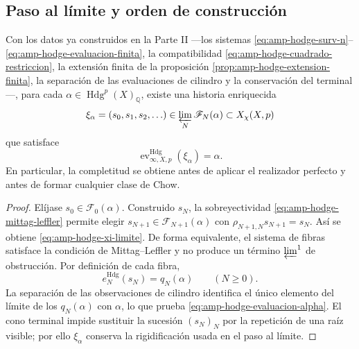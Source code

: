 \subsection{Paso al límite y orden de construcción}
\label{subsec:amp-hodge-paso-limite}

\begin{theorem}
\label{thm:amp-hodge-completitud-coinductiva}
Con los datos ya construidos en la Parte II ---los sistemas
\eqref{eq:amp-hodge-surv-n}--\eqref{eq:amp-hodge-evaluacion-finita}, la
compatibilidad \eqref{eq:amp-hodge-cuadrado-restriccion}, la extensión finita
de la proposición \ref{prop:amp-hodge-extension-finita}, la separación de las
evaluaciones de cilindro y la conservación del terminal---, para cada
\(\alpha\in\operatorname{Hdg}^p(X)_{\mathbb Q}\), existe una historia
enriquecida
\begin{equation}\label{eq:amp-hodge-xi-limite}
 \xi_\alpha=(s_0,s_1,s_2,\ldots)
 \in\varprojlim_N\mathscr F_N(\alpha)
 \subset X_\chi(X,p)
\end{equation}
que satisface
\begin{equation}\label{eq:amp-hodge-evaluacion-alpha}
 \operatorname{ev}^{\mathrm{Hdg}}_{\infty,X,p}(\xi_\alpha)=\alpha.
\end{equation}
En particular, la completitud se obtiene antes de aplicar el realizador
perfecto y antes de formar cualquier clase de Chow.
\end{theorem}

\begin{proof}
Elíjase \(s_0\in\mathscr F_0(\alpha)\). Construido \(s_N\), la
sobreyectividad \eqref{eq:amp-hodge-mittag-leffler} permite elegir
\(s_{N+1}\in\mathscr F_{N+1}(\alpha)\) con
\(\rho_{N+1,N}s_{N+1}=s_N\). Así se obtiene
\eqref{eq:amp-hodge-xi-limite}. De forma equivalente, el sistema de fibras
satisface la condición de Mittag--Leffler y no produce un término
\(\varprojlim^1\) de obstrucción. Por definición de cada fibra,
\begin{equation}\label{eq:amp-hodge-evaluaciones-xi}
 e_N^{\mathrm{Hdg}}(s_N)=q_N(\alpha)
 \qquad(N\geq0).
\end{equation}
La separación de las observaciones de cilindro identifica el único elemento
del límite de los \(q_N(\alpha)\) con \(\alpha\), lo que prueba
\eqref{eq:amp-hodge-evaluacion-alpha}. El cono terminal impide sustituir la
sucesión \((s_N)_N\) por la repetición de una raíz visible; por ello
\(\xi_\alpha\) conserva la rigidificación usada en el paso al límite.
\end{proof}

